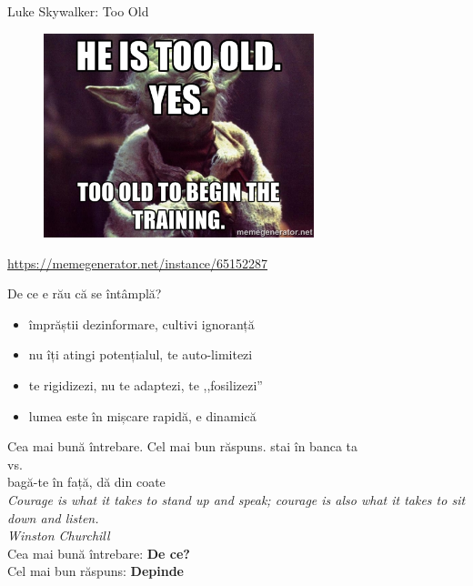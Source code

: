 \documentclass{beamer}
\begin{document}
\begin{frame}{Luke Skywalker: Too Old}
  \begin{figure}
    \centering
    \includegraphics[width=0.7\textwidth]{img/yoda-too-old}
  \end{figure}
  \begin{center}
    \scriptsize
    \url{https://memegenerator.net/instance/65152287}
  \end{center}
\end{frame}

\begin{frame}{De ce e rău că se întâmplă?}
  \begin{itemize}
    \pause \item împrăștii dezinformare, cultivi ignoranță
    \pause \item nu îți atingi potențialul, te auto-limitezi
    \pause \item te rigidizezi, nu te adaptezi, te ,,fosilizezi''
    \pause \item lumea este în mișcare rapidă, e dinamică
  \end{itemize}
\end{frame}

\begin{frame}{Cea mai bună întrebare. Cel mai bun răspuns.}
  \centering
  \pause stai în banca ta \\
    \pause vs. \\
  \pause bagă-te în față, dă din coate\\
  \pause
  \vspace{5mm}
  \textit{Courage is what it takes to stand up and speak; courage is also what it takes to sit down and listen.}\\
  \vspace{3mm}
  \hfill \textit{Winston Churchill}\\
  \vspace{5mm}
  \pause Cea mai bună întrebare: \textbf{De ce?} \\
  \pause Cel mai bun răspuns: \textbf{Depinde}
\end{frame}
\end{document}
